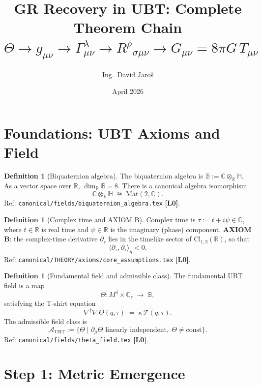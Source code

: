 \documentclass[12pt,a4paper]{article}
\title{\textbf{GR Recovery in UBT: Complete Theorem Chain}\\
  \large $\Theta \to g_{\mu\nu} \to \Gamma^\lambda_{\mu\nu}
         \to R^\rho{}_{\sigma\mu\nu} \to G_{\mu\nu} = 8\pi G\,T_{\mu\nu}$}
\author{Ing.\ David Jaroš}
\date{April 2026}
\theoremstyle{definition}
\newtheorem{definition}[theorem]{Definition}
\theoremstyle{remark}
\newcommand{\Lzero}{\textbf{[L0]}}
\begin{document}
\maketitle
\tableofcontents

\section{Foundations: UBT Axioms and Field}
\label{sec:foundations}

\begin{definition}[Biquaternion algebra]
\label{def:biquaternion_algebra}
The biquaternion algebra is $\mathbb{B} := \mathbb{C}\otimes_{\mathbb{R}}\mathbb{H}$.
As a vector space over $\mathbb{R}$, $\dim_{\mathbb{R}}\mathbb{B} = 8$.
There is a canonical algebra isomorphism
\[
  \mathbb{C}\otimes_{\mathbb{R}}\mathbb{H} \;\cong\; \mathrm{Mat}(2,\mathbb{C}).
\]
Ref: \texttt{canonical/fields/biquaternion\_algebra.tex} \Lzero.
\end{definition}

\begin{definition}[Complex time and AXIOM B]
\label{def:complex_time}
Complex time is $\tau := t + i\psi \in \mathbb{C}$, where $t \in \mathbb{R}$ is
real time and $\psi \in \mathbb{R}$ is the imaginary (phase) component.
\textbf{AXIOM B}: the complex-time derivative $\partial_\tau$ lies in the timelike
sector of $\mathrm{Cl}_{1,3}(\mathbb{R})$, so that
\[
  \langle\partial_\tau, \partial_\tau\rangle_{\eta} < 0.
\]
Ref: \texttt{canonical/THEORY/axioms/core\_assumptions.tex} \Lzero.
\end{definition}

\begin{definition}[Fundamental field and admissible class]
\label{def:theta_field}
The fundamental UBT field is a map
\[
  \Theta : M^4 \times \mathbb{C}_\tau \;\longrightarrow\; \mathbb{B},
\]
satisfying the T-shirt equation
\[
  \nabla^\dagger\nabla\,\Theta(q,\tau) \;=\; \kappa\,\mathcal{T}(q,\tau).
\]
The admissible field class is
\[
  \mathcal{A}_{\mathrm{UBT}}
  := \bigl\{\Theta \;\big|\; \partial_\mu\Theta \text{ linearly independent},\;
     \Theta \neq \mathrm{const}\bigr\}.
\]
Ref: \texttt{canonical/fields/theta\_field.tex} \Lzero.
\end{definition}

\section{Step 1: Metric Emergence}
\label{sec:step1}
\end{document}
